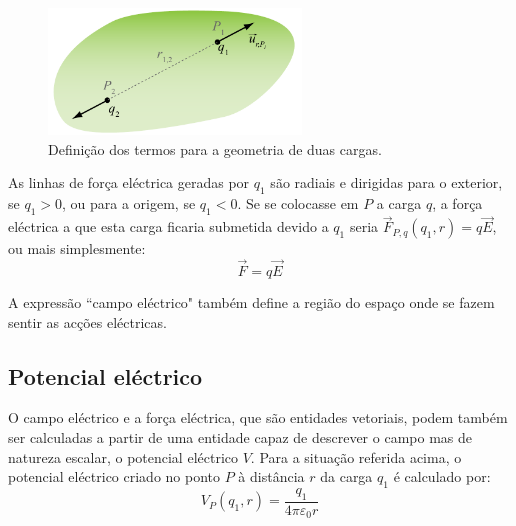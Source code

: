 \documentclass[a4paper,twoside,12pt]{article}      %
\begin{document}
\begin{figure}[tb]
  \centering 
	\includegraphics[width=0.6\textwidth]{./fig1-thomson} 
	\caption{ Definição dos termos para a geometria de duas cargas. \label{fig:fig1}} 

\end{figure}
%
As linhas de força eléctrica geradas por $q_1$ são radiais e dirigidas para o exterior, se $q_1>0$, ou para a origem, se $q_1<0$. Se se colocasse em $P$  a carga $q$,  a força eléctrica a que esta carga ficaria submetida devido a $q_1$  seria	
$\vec{F}_{P,q} (q_1, r ) = q \vec{E}$, 
ou mais simplesmente:
\begin{equation}
\vec{F} = q \vec{E}
\end{equation}

A expressão ``campo eléctrico" também define a região do espaço onde se fazem sentir as acções eléctricas.

\subsection{\sf Potencial eléctrico}
	
O campo eléctrico e a força eléctrica, que são entidades vetoriais, podem também ser calculadas a partir de uma entidade capaz de descrever o campo mas de natureza escalar, o potencial eléctrico $V$. Para a situação referida acima, o potencial eléctrico criado no ponto $P$ à distância $r$ da carga $q_1$ é calculado por:
\begin{equation} \label{eq:pot_ele}
	V_P (q_1, r) = \frac{q_1}{4 \pi \varepsilon_0 r} 
\end{equation}
\end{document}
